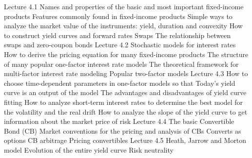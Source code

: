 Lecture 4.1
Names and properties of the basic and most important fixed-income products
Features commonly found in fixed-income products
Simple ways to analyze the market value of the instruments: yield, duration and convexity
How to construct yield curves and forward rates
Swaps
The relationship between swaps and zero-coupon bonds
Lecture 4.2
Stochastic models for interest rates
How to derive the pricing equation for many fixed-income products
The structure of many popular one-factor interest rate models
The theoretical framework for multi-factor interest rate modeling
Popular two-factor models
Lecture 4.3
How to choose time-dependent parameters in one-factor models so that
Today’s yield curve is an output of the model
The advantages and disadvantages of yield curve fitting
How to analyze short-term interest rates to determine the best model for the volatility and the real drift
How to analyze the slope of the yield curve to get information about the market price of risk
Lecture 4.4
The basic Convertible Bond (CB)
Market conventions for the pricing and analysis of CBs
Converts as options
CB arbitrage
Pricing convertibles
Lecture 4.5
Heath, Jarrow and Morton model
Evolution of the entire yield curve
Risk neutrality
